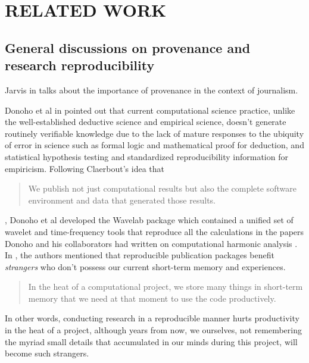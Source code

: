 
\chapter{RELATED WORK}
\label{related-work}

\section{General discussions on provenance and research reproducibility}
\label{sec:reproducibility}
Jarvis in \cite{jarvis2010importance} talks about the importance of provenance in the context of journalism. 

Donoho et al in \cite{donoho2009reproducible} pointed out that current computational science practice, unlike the well-established deductive science and empirical science, doesn't generate routinely verifiable knowledge due to the lack of mature responses to the ubiquity of error in science such as formal logic and mathematical proof for deduction, and statistical hypothesis testing and standardized reproducibility information for empiricism. Following Claerbout's idea that
\begin{quote}
	We publish not just computational results
	but also the complete software environment
	and data that generated those results.
\end{quote}
, Donoho et al developed the Wavelab package which contained a unified set of wavelet and time-frequency tools that reproduce all the calculations in the papers Donoho and his collaborators had written on computational harmonic analysis \cite{buckheit1995wavelab}. In \cite{donoho2009reproducible}, the authors mentioned that reproducible publication packages benefit \emph{strangers} who don't possess our current short-term memory and experiences.
\begin{quote}
	In the heat
	of a computational project, we store many things
	in short-term memory that we need at that moment
	to use the code productively.
\end{quote}
In other words, conducting research in a reproducible manner hurts productivity in the heat of a project, although years from now, we ourselves, not remembering the myriad small details that accumulated in our minds during this project, will become such strangers.

